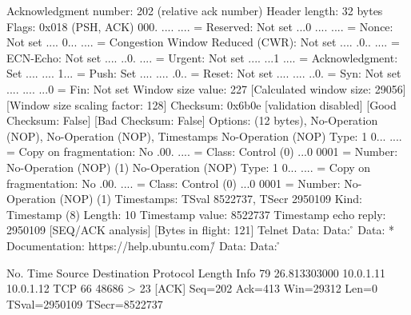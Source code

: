     Acknowledgment number: 202    (relative ack number)
    Header length: 32 bytes
    Flags: 0x018 (PSH, ACK)
        000. .... .... = Reserved: Not set
        ...0 .... .... = Nonce: Not set
        .... 0... .... = Congestion Window Reduced (CWR): Not set
        .... .0.. .... = ECN-Echo: Not set
        .... ..0. .... = Urgent: Not set
        .... ...1 .... = Acknowledgment: Set
        .... .... 1... = Push: Set
        .... .... .0.. = Reset: Not set
        .... .... ..0. = Syn: Not set
        .... .... ...0 = Fin: Not set
    Window size value: 227
    [Calculated window size: 29056]
    [Window size scaling factor: 128]
    Checksum: 0x6b0e [validation disabled]
        [Good Checksum: False]
        [Bad Checksum: False]
    Options: (12 bytes), No-Operation (NOP), No-Operation (NOP), Timestamps
        No-Operation (NOP)
            Type: 1
                0... .... = Copy on fragmentation: No
                .00. .... = Class: Control (0)
                ...0 0001 = Number: No-Operation (NOP) (1)
        No-Operation (NOP)
            Type: 1
                0... .... = Copy on fragmentation: No
                .00. .... = Class: Control (0)
                ...0 0001 = Number: No-Operation (NOP) (1)
        Timestamps: TSval 8522737, TSecr 2950109
            Kind: Timestamp (8)
            Length: 10
            Timestamp value: 8522737
            Timestamp echo reply: 2950109
    [SEQ/ACK analysis]
        [Bytes in flight: 121]
Telnet
    Data: 
    Data: \r\n
    Data:  * Documentation:  https://help.ubuntu.com/\r\n
    Data: 
    Data: \r\n

No.     Time           Source                Destination           Protocol Length Info
     79 26.813303000   10.0.1.11             10.0.1.12             TCP      66     48686 > 23 [ACK] Seq=202 Ack=413 Win=29312 Len=0 TSval=2950109 TSecr=8522737

